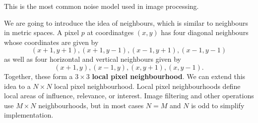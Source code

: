 This is the most common noise model used in image processing.

We are going to introduce the idea of neighbours, which is similar to neighbours in metric spaces. A pixel $p$ at coordinatges $(x, y)$ has four diagonal neighbours whose coordinates are given by
\[ (x+1, y+1), (x+1, y-1), (x-1, y+1), (x-1, y-1) \]
as well as four horizontal and vertical neighbours given by
\[ (x+1, y), (x-1, y), (x, y+1), (x, y-1). \]
Together, these form a $3 \times 3$ \textbf{local pixel neighbourhood}. We can extend this idea to a $N \times N$ local pixel neighbourhood. Local pixel neighbourhoods define local areas of influence, relevance, or interest. Image filtering and other operations use $M \times N$ neighbourhoods, but in most cases $N = M$ and $N$ is odd to simplify implementation. 

